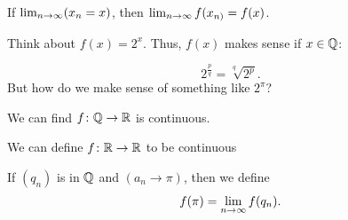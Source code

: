 If \(\lim_{n \rightarrow \infty}(x_{n} = x)\), then \(\lim_{n \rightarrow \infty} f(x_{n)} = f(x)\).

Think about \(f(x) = 2^{x}\). Thus, \(f(x)\) makes sense if \(x \in \mathbb{Q}\):

\[
    2^{\frac{p}{q}} = \sqrt[q]{2^{p}}.
\]
But how do we make sense of something like \(2^{\pi}\)? 

We can find \(f \colon \mathbb{Q} \to \mathbb{R}\) is continuous.

We can define \(f \colon \mathbb{R} \to \mathbb{R}\) to be continuous 

If \((q_{n})\) is in \(\mathbb{Q}\) and \((a_{n} \to \pi)\), then we define 
\[
    f(\pi) = \lim_{n \rightarrow \infty} f(q_{n}).
\]



